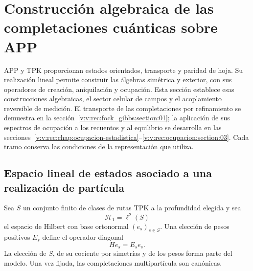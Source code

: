 \section{Construcción algebraica de las completaciones cuánticas sobre APP}
\label{v:v:rec:chap:completaciones-cuanticas}
\label{v:v:sec:completaciones-algebraicas}

APP y TPK proporcionan estados orientados, transporte y paridad de hoja.
Su realización lineal permite construir las álgebras simétrica y exterior,
con sus operadores de creación, aniquilación y ocupación. Esta sección
establece esas construcciones algebraicas, el sector celular de campos y
el acoplamiento reversible de medición. El transporte de las completaciones
por refinamiento se demuestra en la
sección~\ref{v:v:rec:fock_gibbs:section:01}; la aplicación de sus espectros de
ocupación a los recuentos y al equilibrio se desarrolla en las
secciones~\ref{v:v:rec:chap:ocupacion-estadistica}--\ref{v:v:rec:ocupacion:section:03}.
Cada tramo conserva las condiciones de la representación que utiliza.

\subsection{Espacio lineal de estados asociado a una realización de partícula}
\label{v:v:rec:completaciones:section:02}

Sea \(S\) un conjunto finito de clases de rutas TPK a la profundidad elegida
y sea
\[
 \mathcal H_1=\ell^2(S)
\]
el espacio de Hilbert con base ortonormal \((e_s)_{s\in S}\). Una elección de
pesos positivos \(E_s\) define el operador diagonal
\[
 He_s=E_se_s.
\]
La elección de \(S\), de su cociente por simetrías y de los pesos forma parte
del modelo. Una vez fijada, las completaciones multipartícula son canónicas.

